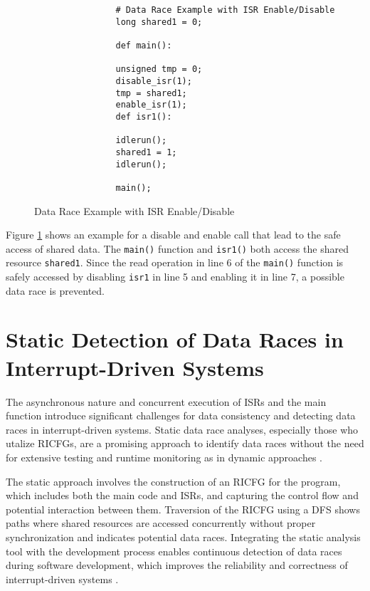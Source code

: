 \documentclass[
fancyheadings, %
%
%
]{stsreprt}
\begin{document}
{\begin{figure}[H]
			\begin{lstlisting}
				# Data Race Example with ISR Enable/Disable
				long shared1 = 0;
				
				def main():
				
				unsigned tmp = 0;
				disable_isr(1);
				tmp = shared1;
				enable_isr(1);
				def isr1():
				
				idlerun();
				shared1 = 1;
				idlerun();
				
				main();
			\end{lstlisting}
			\caption{Data Race Example with ISR Enable/Disable}
			\label{drisr}
		\end{figure}
		Figure \ref{drisr} shows an example for a disable and enable call that lead to the safe access of shared data. The \texttt{main()} function and \texttt{isr1()} both access the shared resource \texttt{shared1}. Since the read operation in line 6 of the \texttt{main()} function is safely accessed by disabling \texttt{isr1} in line 5 and enabling it in line 7, a possible data race is prevented.
		
		\section{Static Detection of Data Races in Interrupt-Driven Systems}
		
		The asynchronous nature and concurrent execution of \acp{ISR} and the main function introduce significant challenges for data consistency and detecting data races in interrupt-driven systems. Static data race analyses, especially those who utalize \acp{RICFG}, are a promising approach to identify data races without the need for extensive testing and runtime monitoring as in dynamic approaches \cite{wang2020}.
		
		The static approach involves the construction of an \ac{RICFG} for the program, which includes both the main code and \acp{ISR}, and capturing the control flow and potential interaction between them. Traversion of the \ac{RICFG} using a \Ac{DFS} shows paths where shared resources are accessed concurrently without proper synchronization and indicates potential data races. Integrating the static analysis tool with the development process enables continuous detection of data races during software development, which improves the reliability and correctness of interrupt-driven systems \cite{wang2020}.
		
}
\end{document}
